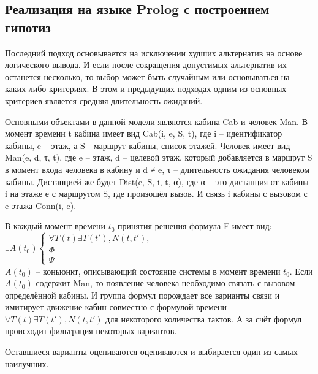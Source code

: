 \subsection{Реализация на языке Prolog с построением гипотиз}
	Последний подход основывается на исключении худших альтернатив на основе логического вывода.
		И если после сокращения допустимых альтернатив их останется несколько, то выбор может быть случайным
		или основываться на каких-либо критериях. В этом и предыдущих подходах
		одним из основных критериев является средняя длительность ожиданий.

	Основными объектами в данной модели являются кабина Cab и человек Man.
		В момент времени t кабина имеет вид Cab(i, e, S, t), где i – идентификатор кабины, e – этаж,
		а S - маршрут кабины, список этажей. Человек имеет вид Man(e, d, τ, t), где e – этаж,
		d – целевой этаж, который добавляется в маршрут S в момент входа человека в кабину и d ≠ e,
		τ – длительность ожидания человеком кабины.
		Дистанцией же будет Dist(e, S, i, t, α), где α – это дистанция от кабины i
		на этаже е с маршрутом S, где произошёл вызов. И связь i кабины с вызовом с e этажа Conn(i, e).

	В каждый момент времени $t_0$ принятия решения формула F имеет вид:\\

	$ \exists A(t_0) \begin{cases} \forall T(t)\exists T(t'), N(t, t'), \\ \Phi \\ \Psi \end{cases} $\\

	$A(t_0)$ -- коньюнкт, описывающий состояние системы в момент времени $t_0$. Если $A(t_0)$ содержит Man,
		то появление человека необходимо связать с вызовом определённой кабины.
		И группа формул \Phi порождает все варианты связи и имитирует движение кабин совместно с
		формулой времени $\forall T(t)\exists T(t'), N(t, t')$ для некоторого количества тактов.
		А за счёт формул \Psi происходит фильтрация некоторых вариантов.

	Оставшиеся варианты оцениваются оцениваются и выбирается один из самых наилучших.
